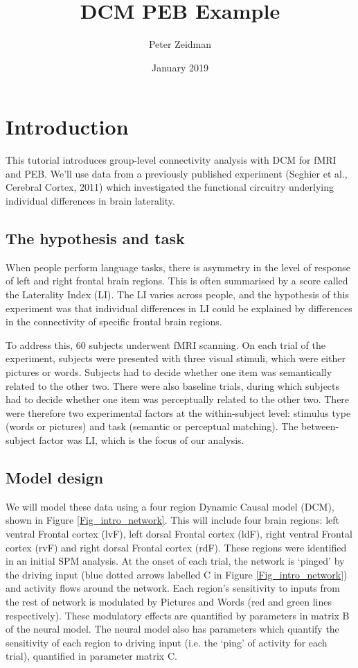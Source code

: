 \documentclass{article}
\title{DCM PEB Example}
\author{Peter Zeidman}
\date{January 2019}
\begin{document}
\maketitle

\tableofcontents

\section{Introduction}
This tutorial introduces group-level connectivity analysis with DCM for fMRI and PEB. We'll use data from a previously published experiment (Seghier et al., Cerebral Cortex, 2011) which investigated the functional circuitry underlying individual differences in brain laterality. 

\subsection{The hypothesis and task}
When people perform language tasks, there is asymmetry in the level of response of left and right frontal brain regions. This is often summarised by a score called the Laterality Index (LI). The LI varies across people, and the hypothesis of this experiment was that individual differences in LI could be explained by differences in the connectivity of specific frontal brain regions. 

To address this, 60 subjects underwent fMRI scanning. On each trial of the experiment, subjects were presented with three visual stimuli, which were either pictures or words. Subjects had to decide whether one item was semantically related to the other two. There were also baseline trials, during which subjects had to decide whether one item was perceptually related to the other two. There were therefore two experimental factors at the within-subject level: stimulus type (words or pictures) and task (semantic or perceptual matching). The between-subject factor was LI, which is the focus of our analysis. 

\subsection{Model design}
We will model these data using a four region Dynamic Causal model (DCM), shown in Figure \ref{Fig_intro_network}. This will include four brain regions: left ventral Frontal cortex (lvF), left dorsal Frontal cortex (ldF), right ventral Frontal cortex (rvF) and right dorsal Frontal cortex (rdF). These regions were identified in an initial SPM analysis. At the onset of each trial, the network is `pinged' by the driving input (blue dotted arrows labelled C in Figure  \ref{Fig_intro_network}) and activity flows around the network. Each region's sensitivity to inputs from the rest of network is modulated by Pictures and Words (red and green lines respectively). These modulatory effects are quantified by parameters in matrix B of the neural model. The neural model also has parameters which quantify the sensitivity of each region to driving input (i.e. the `ping' of activity for each trial), quantified in parameter matrix C. 
\end{document}
